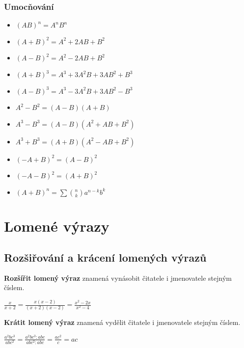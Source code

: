 \documentclass[12pt, a4paper]{article}
\begin{document}
\subsubsection*{Umocňování}
\begin{itemize}
\item $(AB)^n = A^nB^n$
\item $(A+B)^2 = A^2 + 2AB + B^2$
\item $(A-B)^2 = A^2-2AB+B^2$
\item $(A+B)^3=A^3 + 3A^2B + 3AB^2 + B^3$
\item $(A-B)^3=A^3 - 3A^2B + 3AB^2 - B^3$
\item $A^2-B^2 =(A-B)(A+B)$
\item $A^3-B^3 = (A-B)(A^2+AB+B^2)$
\item $A^3+B^3 = (A+B)(A^2-AB+B^2)$
\item $(-A+B)^2 = (A-B)^2$
\item $(-A-B)^2 = (A+B)^2$
\item $(A+B)^n=\sum \binom{n}{k} a^{n-k}b^k $
\end{itemize}

\section{Lomené výrazy}
\subsection*{Rozšiřování a krácení lomených výrazů}
\textbf{Rozšířit lomený výraz} znamená vynásobit čitatele i jmenovatele stejným číslem.\\
\begin{center}
$\frac{x}{x+2}=\frac{x(x-2)}{(x+2)(x-2)}=\frac{x^2-2x}{x^2 - 4}$\\
\end{center}
\textbf{Krátit lomený výraz} znamená vydělit čitatele i jmenovatele stejným číslem.\\
\begin{center}
$\frac{a^2bc^3}{abc^2}=\frac{a^2bc^3:abc}{abc^2:abc}=\frac{ac^2}{c}=ac$\\
\end{center}
\end{document}
